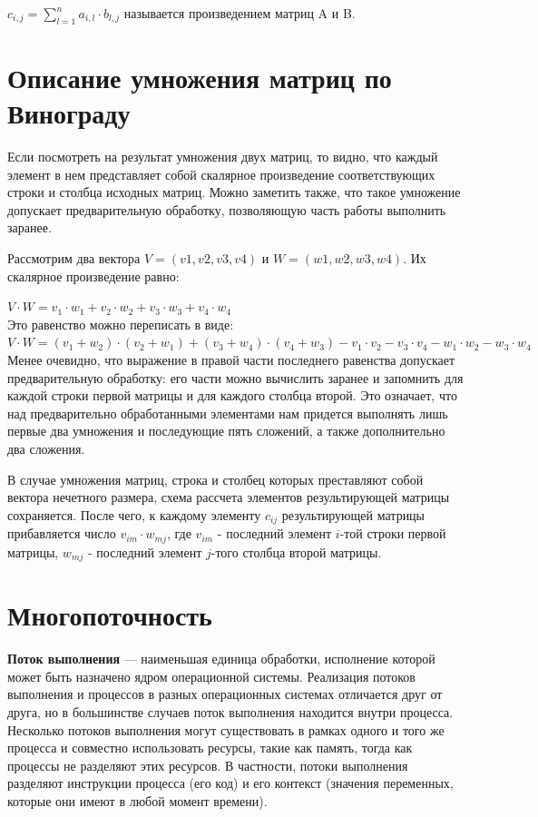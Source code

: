 \documentclass[12pt]{report}
\begin{document}
$c_{i,j} = \sum\limits_{l=1}^n a_{i,l}\cdot b_{l,j}$ называется произведением матриц A и B.

\section{Описание умножения матриц по Винограду}

Если посмотреть на результат умножения двух матриц, то видно, что каждый элемент в нем представляет собой скалярное произведение соответствующих строки и столбца исходных матриц. Можно заметить также, что такое умножение допускает предварительную обработку, позволяющую часть работы выполнить заранее.\vspace{\baselineskip}

Рассмотрим два вектора $V = (v1, v2, v3, v4)$ и $W = (w1, w2, w3, w4)$. Их скалярное произведение равно: 

$ V \cdot W=v_1 \cdot w_1 + v_2 \cdot w_2 + v_3 \cdot w_3 + v_4 \cdot w_4$ \\

Это равенство можно переписать в виде: \\
$V \cdot W=(v_1 + w_2) \cdot (v_2 + w_1) + (v_3 + w_4) \cdot (v_4 + w_3) - v_1 \cdot v_2 - v_3 \cdot v_4 - w_1 \cdot w_2 - w_3 \cdot w_4$\\

Менее очевидно, что выражение в правой части последнего равенства допускает предварительную обработку: его части можно вычислить заранее и запомнить для каждой строки первой матрицы и для каждого столбца второй. 
Это означает, что над предварительно обработанными элементами нам придется выполнять лишь первые два умножения и последующие пять сложений, а также дополнительно два сложения. 

В случае умножения матриц, строка и столбец которых преставляют собой вектора нечетного размера, схема рассчета элементов результирующей матрицы сохраняется. После чего, к каждому элементу $c_{ij}$ результирующей матрицы прибавляется число $v_{im} \cdot w_{mj}$, где $v_{im}$ - последний элемент $i$-той строки первой матрицы, $w_{mj}$ - последний элемент $j$-того столбца второй матрицы.


\section{Многопоточность}

\hspace{0.6cm} \textbf {Поток выполнения} — наименьшая единица обработки, исполнение которой может быть назначено ядром операционной системы. Реализация потоков выполнения и процессов в разных операционных системах отличается друг от друга, но в большинстве случаев поток выполнения находится внутри процесса. Несколько потоков выполнения могут существовать в рамках одного и того же процесса и совместно использовать ресурсы, такие как память, тогда как процессы не разделяют этих ресурсов. В частности, потоки выполнения разделяют инструкции процесса (его код) и его контекст (значения переменных, которые они имеют в любой момент времени).
\end{document}

